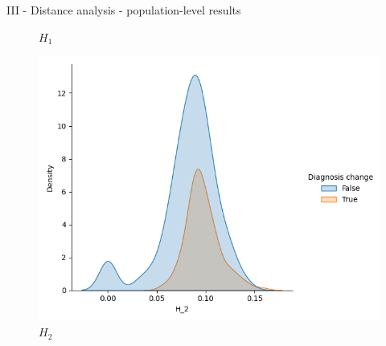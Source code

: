 \documentclass[aspectratio=169, 10pt, dvipsnames]{beamer}
\begin{document}
\begin{frame}[fragile]{III - Distance analysis - population-level results}
\begin{figure}
    \caption{$H_1$}
  \end{figure}%
  \endminipage
  \hfill
  \begin{figure}
    \centering
     \includegraphics[width=\textwidth]{figures/temporal_evolution/bottleneck_H_2_dist_diag_change.png}
    \caption{$H_2$}
  \end{figure}
  \endminipage
\end{frame}
\end{document}
